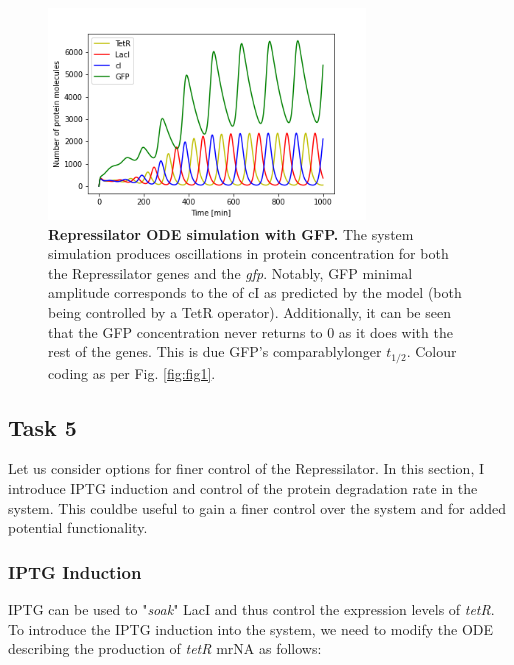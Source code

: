 \documentclass[runningheads,a4paper]{llncs}
\begin{document}
\vspace{-2.2\abovedisplayskip}
\begin{figure}[H]
    \singlespacing
    \centering
    \includegraphics[width=0.75\textwidth,trim={0 0.1cm 0 1.2cm},clip]{suplementary_information_and_code/Task4_figure1.png}
    \caption{\textbf{Repressilator ODE simulation with GFP.} The system simulation produces oscillations in protein concentration for both the Repressilator genes and the \textit{gfp}. Notably, GFP minimal amplitude corresponds to the of cI as predicted by the model (both being controlled by a TetR operator). Additionally, it can be seen that the GFP concentration never returns to 0 as it does with the rest of the genes. This is due GFP's comparably\linebreak longer $t_{1/2}$. Colour coding as per Fig. \ref{fig:fig1}.}
    \label{fig:fig12}
\end{figure}

\subsection*{Task 5}
Let us consider options for finer control of the Repressilator. In this section, I introduce IPTG induction and control of the protein degradation rate in the system. This could\linebreak be useful to gain a finer control over the system and for added potential functionality. 

\subsubsection*{IPTG Induction}
IPTG can be used to "\textit{soak}" LacI and thus control the expression levels of \textit{tetR}. To introduce the IPTG induction into the system, we need to modify the ODE describing the production of \textit{tetR} mrNA as follows:
\end{document}
